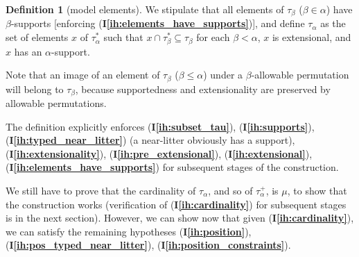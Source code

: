 \documentclass{article}
\theoremstyle{definition}
\newtheorem{definition}[theorem]{Definition}
\theoremstyle{remark}
\newcommand{\ihref}[1]{(\textbf{I\ref{#1}})}
\begin{document}
\begin{definition}[model elements]
We stipulate that all elements of $\tau_\beta$ ($\beta\in \alpha$) have $\beta$-supports [enforcing \ihref{ih:elements_have_supports}], and define $\tau_\alpha$ as the set of elements $x$ of $\tau^*_\alpha$ such that
$x \cap \tau^*_{\beta} \subseteq \tau_\beta$ for each $\beta<\alpha$, $x$ is extensional, and $x$ has an $\alpha$-support.

\end{definition}

Note that an image of an element of $\tau_\beta$ ($\beta\leq \alpha$)  under a $\beta$-allowable permutation will belong to $\tau_\beta$, because supportedness and extensionality are preserved by allowable permutations.

The definition explicitly enforces \ihref{ih:subset_tau}, \ihref{ih:supports}, \ihref{ih:typed_near_litter} (a near-litter obviously has a support), \ihref{ih:extensionality}, \ihref{ih:pre_extensional}, \ihref{ih:extensional}, \ihref{ih:elements_have_supports} for subsequent stages of the construction.

We still have to prove that the cardinality of $\tau_\alpha$, and so of $\tau^+_\alpha$, is $\mu$, to show that the construction works (verification of \ihref{ih:cardinality} for subsequent stages is in the next section).
{However, we can show now that given \ihref{ih:cardinality}, we can satisfy the remaining hypotheses \ihref{ih:position}, \ihref{ih:pos_typed_near_litter}, \ihref{ih:position_constraints}.}
\end{document}
